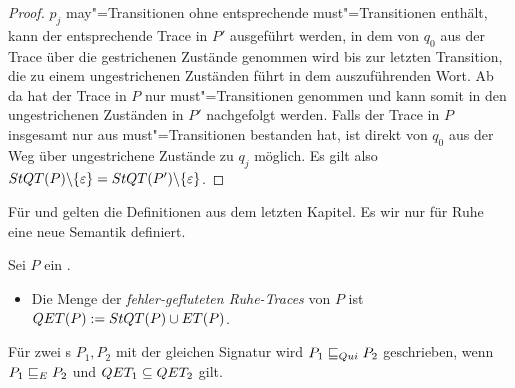 \begin{proof}
  $p_j$ may"=Transitionen ohne entsprechende must"=Transitionen enthält, kann
  der entsprechende Trace in $P'$ ausgeführt werden, in dem von $q_0$ aus der
  Trace über die gestrichenen Zustände genommen wird bis zur letzten
  Transition, die zu einem ungestrichenen Zuständen führt in dem auszuführenden
  Wort. Ab da hat der Trace in $P$ nur must"=Transitionen genommen und kann
  somit in den ungestrichenen Zuständen in $P'$ nachgefolgt werden. Falls der
  Trace in $P$ insgesamt nur aus must"=Transitionen bestanden hat, ist direkt
  von $q_0$ aus der Weg über ungestrichene Zustände zu $q_j$ möglich. Es gilt
  also $StQT (P)\backslash \{\varepsilon\} = StQT (P')\backslash
  \{\varepsilon\}$.
\end{proof}

Für \ET{} und \EL{} gelten die Definitionen aus dem letzten Kapitel. Es wir nur
für Ruhe eine neue Semantik definiert.

\begin{Def}
  \label{RuheSemDef}
  Sei $P$ ein \MEIO{}.
  \begin{itemize}
    \item Die Menge der \emph{fehler-gefluteten Ruhe-Traces} von $P$ ist $QET
      (P):= StQT (P)\cup ET (P)$.
  \end{itemize}
  Für zwei \MEIO{}s $P_1,P_2$ mit der gleichen Signatur wird $P_1 \sqsubseteq  _{Qui}{} P_2$
  geschrieben, wenn $P_1 \sqsubseteq  _E{} P_2$ und $QET _1\subseteq QET _2$ gilt.
\end{Def}

\vspace{0.2cm}

